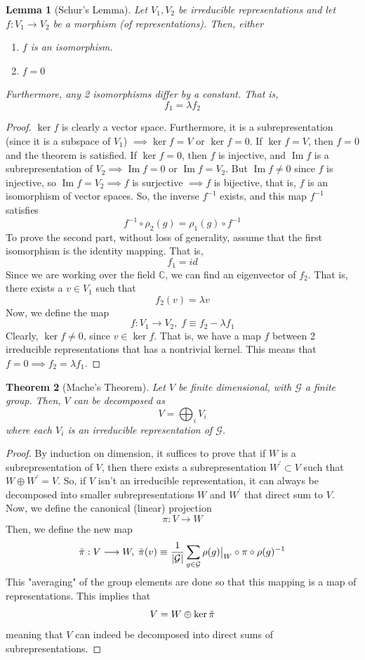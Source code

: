 \documentclass{article}
\DeclareMathOperator{\im}{Im}
\newtheorem{theorem}{Theorem}[section]
\newtheorem{lemma}[theorem]{Lemma}
\theoremstyle{remark}
\theoremstyle{definition}
\begin{document}
\begin{lemma}[Schur's Lemma]
Let $V_1, V_2$ be irreducible representations and let $f: V_1 \longrightarrow V_2$ be a morphism (of representations). Then, either
\begin{enumerate}
    \item $f$ is an isomorphism. 
    \item $f = 0$
\end{enumerate}
Furthermore, any 2 isomorphisms differ by a constant. That is, 
\[f_1 = \lambda f_2\]
\end{lemma}
\begin{proof}
$\ker{f}$ is clearly a vector space. Furthermore, it is a subrepresentation (since it is a subspace of $V_1$) $\implies \ker{f} = V$ or $\ker{f} = 0$. If $\ker{f} = V$, then $f = 0$ and the theorem is satisfied. If $\ker{f} = 0$, then $f$ is injective, and $\im{f}$ is a subrepresentation of $V_2 \implies \im{f} = 0$ or $\im{f} = V_2$. But $\im{f} \neq 0$ since $f$ is injective, so $\im{f} = V_2 \implies f$ is surjective $\implies f$ is bijective, that is, $f$ is an isomorphism of vector spaces. So, the inverse $f^{-1}$ exists, and this map $f^{-1}$ satisfies
\[f^{-1} \circ \rho_2(g) = \rho_1 (g) \circ f^{-1}\]
To prove the second part, without loss of generality, assume that the first isomorphism is the identity mapping. That is, 
\[f_1 = id\]
Since we are working over the field $\mathbb{C}$, we can find an eigenvector of $f_2$. That is, there exists a $v \in V_1$ such that 
\[f_2 (v) = \lambda v\]
Now, we define the map
\[f: V_1 \longrightarrow V_2, \; f \equiv f_2 - \lambda f_1\]
Clearly, $\ker{f} \neq 0$, since $v \in \ker{f}$. That is, we have a map $f$ between 2 irreducible representations that has a nontrivial kernel. This means that $f = 0 \implies f_2 = \lambda f_1$.  
\end{proof}

\begin{theorem}[Mache's Theorem]
Let $V$ be finite dimensional, with $\mathcal{G}$ a finite group. Then, $V$ can be decomposed as 
\[V = \bigoplus_{i} V_i\]
where each $V_i$ is an irreducible representation of $\mathcal{G}$. 
\end{theorem}
\begin{proof}
By induction on dimension, it suffices to prove that if $W$ is a subrepresentation of $V$, then there exists a subrepresentation $W^\prime \subset V$ such that $W \oplus W^\prime = V$. So, if $V$ isn't an irreducible representation, it can always be decomposed into smaller subrepresentations $W$ and $W^\prime$ that direct sum to $V$. Now, we define the canonical (linear) projection 
\[\pi: V \longrightarrow W\]
Then, we define the new map 
\[\Tilde{\pi}: V \longrightarrow W, \; \Tilde{\pi}(v) \equiv \frac{1}{|\mathcal{G}|} \sum_{g \in \mathcal{G}} \rho(g)\big|_W \circ \pi \circ \rho(g)^{-1}\]
This "averaging" of the group elements are done so that this mapping is a map of representations. This implies that 
\[V = W \oplus \ker{\Tilde{\pi}}\]
meaning that $V$ can indeed be decomposed into direct sums of subrepresentations. 
\end{proof}
\end{document}
